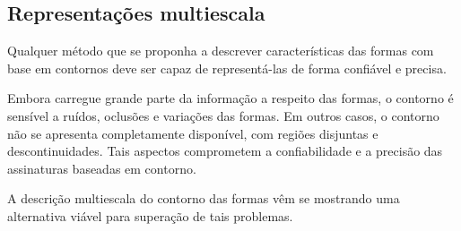 \subsection{Representações multiescala\label{chap:multiescala}} 

Qualquer método que se proponha a descrever características das formas com base em contornos deve ser capaz de representá-las de forma confiável e precisa. 

\begin{comment}Segundo \citeonline{149591}, esses devem satisfazer os seguintes requisitos:

\begin{alineas}
\item Invariância: duas curvas que tenham a mesma forma devem ter a mesma representação;
\item Unicidade: duas curvas que não tenham a mesma forma devem apresentar diferentes representações;
\item Estabilidade: pequenas variações observadas entre duas curvas devem resultar em pequenas variações em suas representações;
\item Eficiência: uma vez que alguns sistemas de visão computacional apresentam requisitos de tempo real, a descrição deve ser computacionalmente eficaz, demandando poucos recursos de memória e de processamento;
\item Fácil implementação: é recomendável que os métodos de descrição sejam simples e de fácil implementação de modo a requerer menos tempo de implementação e depuração; 
\item Relação com propriedades específicas das formas: o método de descrição deve ser capaz de representar propriedades das formas que este descreve.
\end{alineas}

Os referidos autores afirmam que muitos dos métodos de extração encontrados em visão computacional falharam em satisfazer um ou mais dentre estes requisitos.
\end{comment}

Embora carregue grande parte da informação a respeito das formas, o contorno é  sensível a ruídos, oclusões e variações das formas.  Em outros casos, o contorno não se apresenta completamente disponível, com regiões disjuntas e descontinuidades. Tais aspectos comprometem a confiabilidade e a precisão das assinaturas baseadas em contorno.  

A descrição multiescala do contorno das formas vêm se mostrando uma alternativa viável para superação de tais problemas. 


